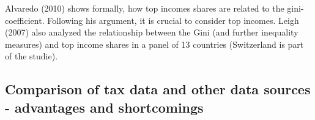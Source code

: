 Alvaredo (2010) shows formally, how top incomes shares are related to the gini-coefficient. Following his argument, it is crucial to consider top incomes. Leigh (2007) also analyzed the relationship between the Gini (and further inequality measures) and top income shares in a panel of 13 countries (Switzerland is part of the studie). 

\subsection{Comparison of tax data and other data sources - advantages and shortcomings}



